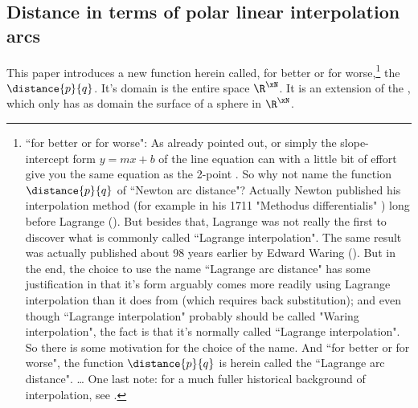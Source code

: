 \subsection{Distance in terms of polar linear interpolation arcs}
This paper introduces a new function herein called, for better or for worse,\footnote{
  ``for better or for worse": 
  As already pointed out,  or simply the
  slope-intercept form $y=mx+b$ of the line equation can with a little bit of effort
  give you the same equation as the 2-point .
  So why not name the function $\distance{p}{q}$ of  
  ``Newton arc distance"? Actually Newton published
  his interpolation method 
  (for example in his 1711 "Methodus differentialis" ) 
  long before Lagrange (). 
  But besides that, Lagrange was not really the first to discover 
  what is commonly called ``Lagrange interpolation". 
  The same result was actually published about 98 years earlier by
  Edward Waring (). 
  But in the end, the choice to use the name ``Lagrange arc distance" has some justification 
  in that it's form arguably comes more readily using Lagrange interpolation than it does from
   (which requires back substitution); 
  and even though ``Lagrange interpolation" probably should be called "Waring interpolation", the
  fact is that it's normally called ``Lagrange interpolation".
  So there is some motivation for the choice of the name.
  And ``for better or for worse", the function $\distance{p}{q}$ is herein called
  the ``Lagrange arc distance". \ldots
  One last note: for a much fuller historical background of interpolation, see .
  } 
the   $\distance{p}{q}$.
It's domain is the entire space $\R^\xN$.
It is an extension of the ,
which only has as domain the surface of a sphere in $\R^\xN$.  %

